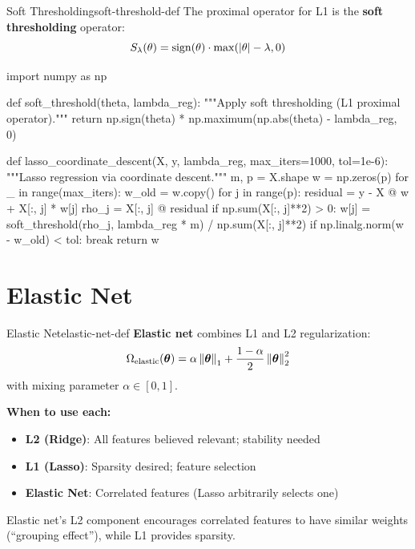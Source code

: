 \documentclass[../../main.tex]{subfiles}
\begin{document}
\begin{definition}{Soft Thresholding}{soft-threshold-def}
The proximal operator for L1 is the \textbf{soft thresholding} operator:
\[
    S_\lambda(\theta) = \operatorname{sign}(\theta) \cdot \max(|\theta| - \lambda, 0)
\]
\end{definition}

\begin{pythoncode}
import numpy as np

def soft_threshold(theta, lambda_reg):
    """Apply soft thresholding (L1 proximal operator)."""
    return np.sign(theta) * np.maximum(np.abs(theta) - lambda_reg, 0)

def lasso_coordinate_descent(X, y, lambda_reg, max_iters=1000, tol=1e-6):
    """Lasso regression via coordinate descent."""
    m, p = X.shape
    w = np.zeros(p)
    for _ in range(max_iters):
        w_old = w.copy()
        for j in range(p):
            residual = y - X @ w + X[:, j] * w[j]
            rho_j = X[:, j] @ residual
            if np.sum(X[:, j]**2) > 0:
                w[j] = soft_threshold(rho_j, lambda_reg * m) / np.sum(X[:, j]**2)
        if np.linalg.norm(w - w_old) < tol:
            break
    return w
\end{pythoncode}

\section{Elastic Net}
\label{sec:elastic-net}

\begin{definition}{Elastic Net}{elastic-net-def}
\textbf{Elastic net} combines L1 and L2 regularization:
\[
    \Omega_{\text{elastic}}(\boldsymbol{\theta}) = \alpha\left\lVert \boldsymbol{\theta} \right\rVert_1 + \frac{1-\alpha}{2}\left\lVert \boldsymbol{\theta} \right\rVert_2^2
\]
with mixing parameter $\alpha \in [0,1]$.
\end{definition}

\begin{keyconcept}
\textbf{When to use each:}
\begin{itemize}
    \item \textbf{L2 (Ridge)}: All features believed relevant; stability needed
    \item \textbf{L1 (Lasso)}: Sparsity desired; feature selection
    \item \textbf{Elastic Net}: Correlated features (Lasso arbitrarily selects one)
\end{itemize}
Elastic net's L2 component encourages correlated features to have similar weights (``grouping effect''), while L1 provides sparsity.
\end{keyconcept}
\end{document}
